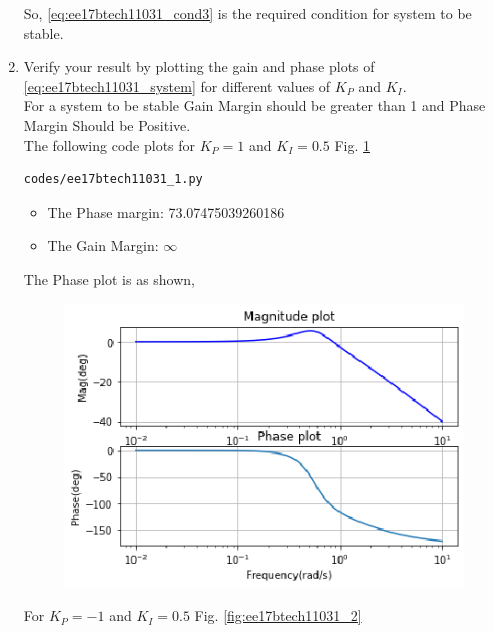 \begin{enumerate}[label=\thesection.\arabic*.,ref=\thesection.\theenumi]
So, \eqref{eq:ee17btech11031_cond3} is the required condition for system to be stable.


\item Verify your result by plotting the gain and phase plots of \eqref{eq:ee17btech11031_system} for different values of $K_{P}$ and $K_{I}$.
\\
\solution For a system to be stable Gain Margin should be greater than 1 and Phase Margin Should be Positive.
\\
The following code plots for $K_{P} = 1$ and $K_{I} = 0.5$ Fig. \ref{fig:ee17btech11031_1}

\begin{lstlisting}
codes/ee17btech11031_1.py
\end{lstlisting}
\begin{itemize}
    \item The Phase margin: 73.07475039260186
    \item The Gain Margin: $\infty$
\end{itemize}

The Phase plot is as shown,
\begin{figure}[!ht]
  \centering
  \includegraphics[width=\columnwidth]{./figs/ee17btech11031_1.eps}
  \caption{}
  \label{fig:ee17btech11031_1}
\end{figure}

For $K_{P} = -1$ and $K_{I} = 0.5$ Fig. \ref{fig:ee17btech11031_2} 


\end{enumerate}

